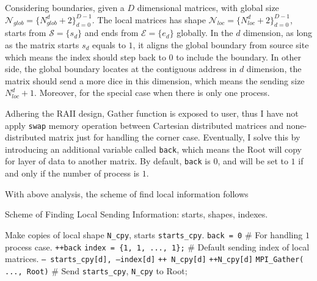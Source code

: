Considering boundaries, given a $D$ dimensional matrices, with global size $\mathcal{N}_{glob} = \{N_{glob}^d + 2\}_{d = 0}^{D-1}$.
The local matrices has shape $\mathcal{N}_{loc} = \{N_{loc}^d+2\}_{d=0}^{D-1}$, starts from $\mathcal{S} = \{s_d\}$ and ends from $\mathcal{E} = \{e_d\}$ globally.
In the $d$ dimension, as long as the matrix starts $s_d$ equals to $1$, it aligns the global boundary from source site which means the index should step back to $0$ to 
include the boundary. 
In other side, the global boundary locates at the contiguous address in $d$ dimension, 
the matrix should send a more dice in this dimension, which means the sending size $N_{loc}^{d} + 1$.
Moreover, for the special case when there is only one process. 

Adhering the RAII design, Gather function is exposed to user, thus I have not apply \texttt{swap} memory operation between Cartesian distributed matrices and none-distributed matrix just 
for handling the corner case. 
Eventually, I solve this by introducing an additional variable called \texttt{back}, which means the Root will copy for layer of data to another matrix. 
By default, \texttt{back} is $0$, and will be set to $1$ if and only if the number of process is $1$. 

With above analysis, the scheme of find local information follows 
\begin{algorithm}
  \caption{Scheme of Finding Local Sending Information: starts, shapes, indexes.}
  \label{ALG:SCHEME:Find_LOCAL_SEND_INFO}
  \begin{algorithmic}[1]
    \STATE Make copies of local shape \texttt{N\_cpy}, starts \texttt{starts\_cpy}.
    \STATE \texttt{back = 0}                           \hfill \# For handling $1$ process case.
      \STATE \texttt{++back}
    \ENDIF
    \STATE \texttt{index = \{1, 1, ..., 1\};}  \hfill \# Default sending index of local matrices.
        \STATE \texttt{-- starts\_cpy[d], --index[d]}
        \STATE \texttt{++ N\_cpy[d]}
      \ENDIF
        \STATE \texttt{++N\_cpy[d]}
      \ENDIF
      \STATE \texttt{MPI\_Gather( ..., Root)}  \hfill \# Send \texttt{starts\_cpy}, \texttt{N\_cpy} to Root;
    \ENDFOR
  \end{algorithmic}
\end{algorithm}

